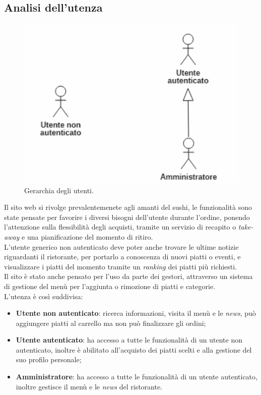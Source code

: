 \documentclass{template}
\begin{document}
	\subsection{Analisi dell'utenza}
    
    \begin{figure}[H]
		\centering
		\includegraphics[scale=0.2]{src/gerarchia_utenti.png}
		\caption{Gerarchia degli utenti.}
	\end{figure}

	Il sito web si rivolge prevalentemenete agli amanti del sushi, le funzionalità sono state pensate per favorire i diversi bisogni dell'utente durante l'ordine, ponendo l'attenzione sulla flessibilità degli acquisti, tramite un servizio di recapito o \textit{take-away} e una pianificazione del momento di ritiro. \\
    L'utente generico non autenticato deve poter anche trovare le ultime notizie riguardanti il ristorante, per portarlo a conoscenza di nuovi piatti o eventi, e visualizzare i piatti del momento tramite un \textit{ranking} dei piatti più richiesti. \\
    Il sito è stato anche pensato per l'uso da parte dei gestori, attraverso un sistema di gestione del menù per l'aggiunta o rimozione di piatti e categorie. \\
    L'utenza è così suddivisa:
	\begin{itemize}
		\item \textbf{Utente non autenticato}: ricerca informazioni, visita il menù e le \textit{news}, può aggiungere piatti al carrello ma non può finalizzare gli ordini;
		\item \textbf{Utente autenticato}: ha accesso a tutte le funzionalità di un utente non autenticato, inoltre è abilitato all'acquisto dei piatti scelti e alla gestione del suo profilo personale;
		\item \textbf{Amministratore}: ha accesso a tutte le funzionalità di un utente autenticato, inoltre gestisce il menù e le \textit{news} del ristorante.
	\end{itemize}
\end{document}
